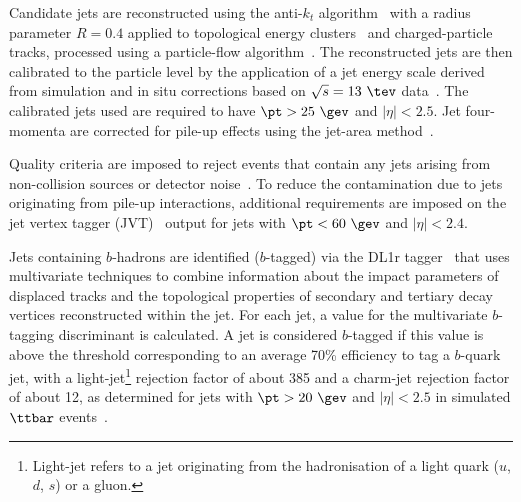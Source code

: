 \documentclass[PAPER, coverpage, atlasdraft=true, texlive=2016, UKenglish]{\ATLASLATEXPATH atlasdoc} %
\begin{document}
Candidate jets are reconstructed using the anti-$k_t$ algorithm~\cite{Cacciari:2008gp,Cacciari:2005hq} with a
radius parameter $R=0.4$ applied to topological energy clusters~\cite{Aad:2016upy} and charged-particle tracks, processed using
a particle-flow algorithm~\cite{Aad:2017epj77}. %
The reconstructed jets are then calibrated to the particle level by the application of a jet energy scale 
derived from simulation and in situ corrections based on $\sqrt{s}=13~\tev$ data~\cite{Aaboud:2017jcu}. %
The calibrated jets used are required to have $\pt > 25~\gev$ and $|\eta| < 2.5$.
Jet four-momenta are corrected for pile-up effects using the jet-area method~\cite{Cacciari:2008gn}.

Quality criteria are imposed to reject events that contain any jets arising from non-collision sources
or detector noise~\cite{ATLAS-CONF-2015-029}.  To reduce the contamination due to jets originating from pile-up interactions,
additional requirements are imposed on the jet vertex tagger (JVT)~\cite{Aad:2015ina} output for jets with $\pt<60~\gev$ and $|\eta| < 2.4$.

Jets containing $b$-hadrons are identified ($b$-tagged) via the DL1r tagger~\cite{Aad:2019epj79,ATL-PHYS-PUB-2017-013} %
that uses multivariate techniques to combine information about the impact parameters of displaced tracks and the  topological properties 
of secondary and tertiary decay vertices reconstructed within the jet. For each jet, a value for the multivariate $b$-tagging discriminant is 
calculated. A jet is considered $b$-tagged if this value is above the threshold corresponding to
an average 70\% efficiency to tag a $b$-quark jet, with a light-jet\footnote{Light-jet refers to a jet originating from the hadronisation of a light quark ($u$, $d$, $s$) or a gluon.} rejection factor of about 385 and a charm-jet rejection factor of about 12, as determined for jets with
$\pt >20~\gev$ and $|\eta|<2.5$ in simulated $\ttbar$ events~\cite{Aad:2019epj79}.
\end{document}
